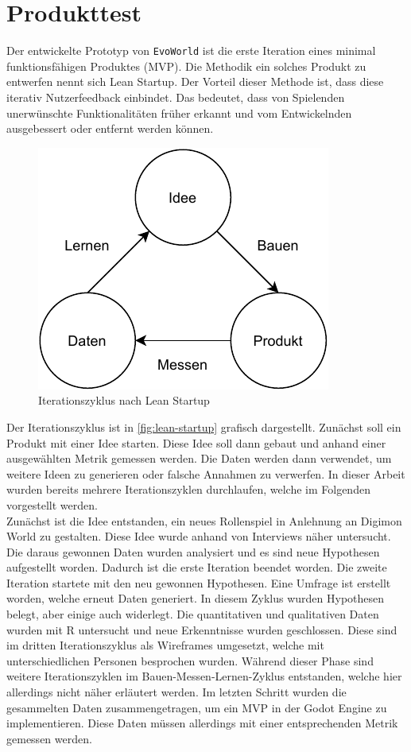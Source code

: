 \section{Produkttest}\label{sec:testing}
Der entwickelte Prototyp von \texttt{EvoWorld} ist die erste Iteration eines minimal funktionsfähigen Produktes (\ac{MVP}). Die Methodik ein solches Produkt zu entwerfen nennt sich Lean Startup\cite{lean-startup}. Der Vorteil dieser Methode ist, dass diese iterativ Nutzerfeedback einbindet. Das bedeutet, dass von Spielenden unerwünschte Funktionalitäten früher erkannt und vom Entwickelnden ausgebessert oder entfernt werden können. \\

\begin{figure}[H]
\centering
\includegraphics[width=0.5\columnwidth]{figures/lean-startup.pdf}
\caption{\label{fig:lean-startup}Iterationszyklus nach Lean Startup}
\end{figure}

Der Iterationszyklus ist in \autoref{fig:lean-startup} grafisch dargestellt\cite[vgl.][S. 75]{lean-startup}. Zunächst soll ein Produkt mit einer Idee starten. Diese Idee soll dann gebaut und anhand einer ausgewählten Metrik gemessen werden. Die Daten werden dann verwendet, um weitere Ideen zu generieren oder falsche Annahmen zu verwerfen. In dieser Arbeit wurden bereits mehrere Iterationszyklen durchlaufen, welche im Folgenden vorgestellt werden. \\

Zunächst ist die Idee entstanden, ein neues Rollenspiel in Anlehnung an Digimon World zu gestalten. Diese Idee wurde anhand von Interviews näher untersucht. Die daraus gewonnen Daten wurden analysiert und es sind neue Hypothesen aufgestellt worden. Dadurch ist die erste Iteration beendet worden. Die zweite Iteration startete mit den neu gewonnen Hypothesen. Eine Umfrage ist erstellt worden, welche erneut Daten generiert. In diesem Zyklus wurden Hypothesen belegt, aber einige auch widerlegt. Die quantitativen und qualitativen Daten wurden mit R untersucht und neue Erkenntnisse wurden geschlossen. Diese sind im dritten Iterationszyklus als Wireframes umgesetzt, welche mit unterschiedlichen Personen besprochen wurden. Während dieser Phase sind weitere Iterationszyklen im Bauen-Messen-Lernen-Zyklus entstanden, welche hier allerdings nicht näher erläutert werden. Im letzten Schritt wurden die gesammelten Daten zusammengetragen, um ein \ac{MVP} in der Godot Engine zu implementieren. Diese Daten müssen allerdings mit einer entsprechenden Metrik gemessen werden. \\

